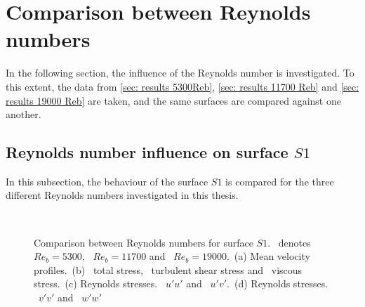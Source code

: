\section{Comparison between Reynolds numbers}
In the following section, the influence of the Reynolds number is investigated.
To this extent, the data from \autoref{sec: results 5300Reb}, \autoref{sec: results 11700 Reb} and \autoref{sec: results 19000 Reb} are taken, and the same surfaces are compared against one another.
\subsection{Reynolds number influence on surface $S1$} \label{subsec: Reynolds comp S1}

In this subsection, the behaviour of the surface $S1$ is compared for the three different Reynolds numbers investigated in this thesis.
\begin{figure}[h]
    \centering
    \begin{subfigure}{0.495\textwidth}
        \centering
        \subcaption{}
        
        \label{subfig: Reynolds comp S1 velocity}
    \end{subfigure}
    \hfill
    \begin{subfigure}{0.495\textwidth}
        \centering
        \subcaption{}
        
        \label{subfig: Reynolds comp S1 total stress}
    \end{subfigure}
    \plotverticalspacing
    \begin{subfigure}{0.495\textwidth}
        \centering
        \subcaption{}
        
        \label{subfig: Reynolds comp S1 Reynolds stresses uu}
    \end{subfigure}
    \hfill
    \begin{subfigure}{0.495\textwidth}
        \centering
        \subcaption{}
        
        \label{subfig: Reynolds comp S1 Reynolds stresses vv}
    \end{subfigure} 
    \\[-10pt]  
    \caption[Comparison of surface $S1$ with different Reynolds numbers]{Comparison between Reynolds numbers for surface $S1$.  \sOneFiveThreeSymbol\ denotes $Re_b = 5300$, \sOneElevenSevenSymbol \ $Re_b = 11700$ and \sOneNineteenSymbol\ $Re_b = 19000$.~(a) Mean velocity profiles.~(b) \lsTotalStressSymbol \ total stress, \lsReynoldsStressSymbol \ turbulent shear stress and \lsViscousStressSymbol\ viscous stress.~(c) Reynolds stresses. \lsRuuSymbol \ $u'u'$ and \lsRuvSymbol \ $u'v'$.~(d) Reynolds stresses. \lsRvvSymbol \ $v'v'$ and \lsRwwSymbol \ $w'w'$}
    \label{fig: results Reynolds comparison S1}
\end{figure}

